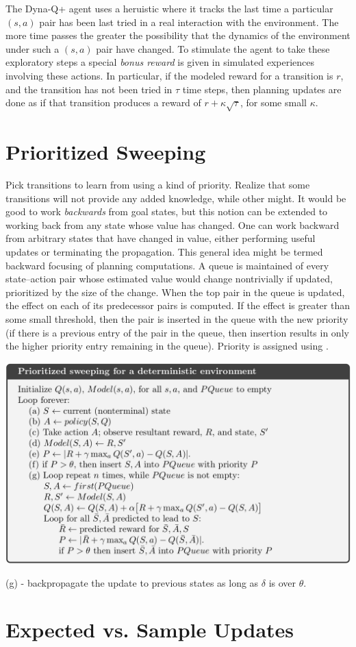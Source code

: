 The Dyna-Q+ agent uses a heruistic where it tracks the last time a particular $(s,a)$ pair has
been last tried in a real interaction with the environment.
The more time passes the greater the possibility that the dynamics of the environment under such a
$(s,a)$ pair have changed.
To stimulate the agent to take these exploratory steps a special \emph{bonus reward} is given in
simulated experiences involving these actions.
In particular, if the modeled reward for a transition is $r$, and the transition has not been tried
in $\tau$ time steps, then planning updates are done as if that transition produces a reward
of $r+\kappa\sqrt{\tau}$, for some small $\kappa$.


\section{Prioritized Sweeping}
\label{sec:prioritized_sweeping}
Pick transitions to learn from using a kind of priority.
Realize that some transitions will not provide any added knowledge, while other might.
It would be good to work \emph{backwards} from goal states, but this notion can be extended to
working back from any state whose value has changed.
One can work backward from arbitrary states that have changed in value, either performing
useful updates or terminating the propagation.
This general idea might be termed backward focusing of planning computations.
A queue is maintained of every state–action pair whose estimated value would change
nontrivially if updated, prioritized by the size of the change.
When the top pair in the queue is updated, the effect on each of its predecessor pairs is
computed.
If the effect is greater than some small threshold, then the pair is inserted in the queue
with the new priority (if there is a previous entry of the pair in the queue, then insertion
results in only the higher priority entry remaining in the queue).
Priority is assigned using .

\begin{center}
    \includegraphics[width=\textwidth]{img/prioritized_sweeping.png}
\end{center}
(g) - backpropagate the update to previous states as long as $\delta$ is over $\theta$.


\section{Expected vs. Sample Updates}
\label{sc:expected_vs_sample_updates}
